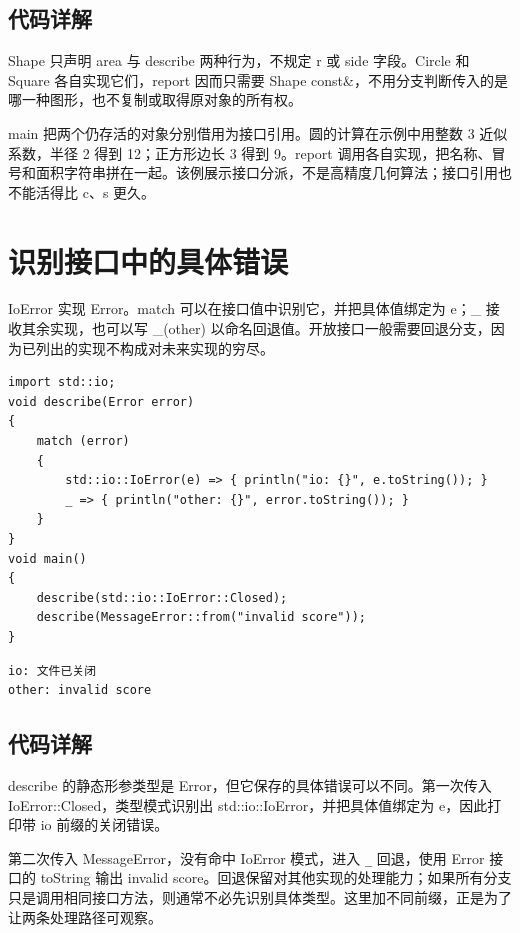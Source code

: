 \subsection*{代码详解}

Shape 只声明 area 与 describe 两种行为，不规定 r 或 side 字段。Circle 和 Square 各自实现它们，report 因而只需要 Shape const\&，不用分支判断传入的是哪一种图形，也不复制或取得原对象的所有权。

main 把两个仍存活的对象分别借用为接口引用。圆的计算在示例中用整数 3 近似系数，半径 2 得到 12；正方形边长 3 得到 9。report 调用各自实现，把名称、冒号和面积字符串拼在一起。该例展示接口分派，不是高精度几何算法；接口引用也不能活得比 c、s 更久。

\section{识别接口中的具体错误}

IoError 实现 Error。match 可以在接口值中识别它，并把具体值绑定为 e；\_ 接收其余实现，也可以写 \_(other) 以命名回退值。开放接口一般需要回退分支，因为已列出的实现不构成对未来实现的穷尽。

\par
\medskip
\begin{lstlisting}[style=chali]
import std::io;
void describe(Error error)
{
    match (error)
    {
        std::io::IoError(e) => { println("io: {}", e.toString()); }
        _ => { println("other: {}", error.toString()); }
    }
}
void main()
{
    describe(std::io::IoError::Closed);
    describe(MessageError::from("invalid score"));
}
\end{lstlisting}
\par
\medskip

\par
\medskip
\begin{lstlisting}[style=out]
io: 文件已关闭
other: invalid score
\end{lstlisting}
\par
\medskip

\subsection*{代码详解}

describe 的静态形参类型是 Error，但它保存的具体错误可以不同。第一次传入 IoError::Closed，类型模式识别出 std::io::IoError，并把具体值绑定为 e，因此打印带 io 前缀的关闭错误。

第二次传入 MessageError，没有命中 IoError 模式，进入 \texttt{\_\allowbreak{}} 回退，使用 Error 接口的 toString 输出 invalid score。回退保留对其他实现的处理能力；如果所有分支只是调用相同接口方法，则通常不必先识别具体类型。这里加不同前缀，正是为了让两条处理路径可观察。


